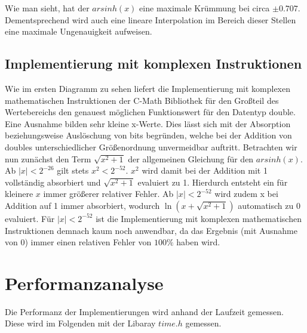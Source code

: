 \documentclass[course=erap] {aspdoc}
\begin{document}
    

    Wie man sieht, hat der $arsinh(x)$ eine maximale Krümmung bei circa $\pm 0.707$. Dementsprechend wird auch eine lineare Interpolation im Bereich dieser Stellen eine maximale Ungenauigkeit aufweisen.
    
    \subsection{Implementierung mit komplexen Instruktionen}
    Wie im ersten Diagramm zu sehen liefert die Implementierung mit komplexen mathematischen Instruktionen der C-Math Bibliothek für den Großteil des Wertebereichs den genauest möglichen Funktionswert für den Datentyp double. Eine Ausnahme bilden sehr kleine x-Werte. Dies lässt sich mit der Absorption beziehungsweise Auslöschung von bits begründen, welche bei der Addition von doubles unterschiedlicher Größenordnung unvermeidbar auftritt. Betrachten wir nun zunächst den Term $\sqrt{x^2 + 1}$ der allgemeinen Gleichung für den $arsinh(x)$. Ab $|x|<2^{-26}$ gilt stets $x^2<2^{-52}$. $x^2$ wird damit bei der Addition mit 1 vollständig absorbiert und $\sqrt{x^2 + 1}$ evaluiert zu 1. Hierdurch entsteht ein für kleinere $x$ immer größerer relativer Fehler. Ab $|x|<2^{-52}$ wird zudem x bei Addition auf 1 immer absorbiert, wodurch $\ln{(x+\sqrt{x^2 + 1})}$ automatisch zu 0 evaluiert. Für $|x|<2^{-52}$ ist die Implementierung mit komplexen mathematischen Instruktionen demnach kaum noch anwendbar, da das Ergebnis (mit Ausnahme von 0) immer einen relativen Fehler von $100\%$ haben wird.
    
    \section{Performanzanalyse}
    Die Performanz der Implementierungen wird anhand der Laufzeit gemessen.
    Diese wird im Folgenden mit der Libaray $time.h$ gemessen.
\end{document}
